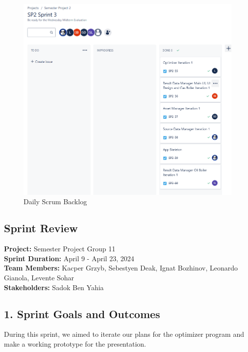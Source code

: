 \documentclass[12pt]{report}
\begin{document}
\begin{figure}[H]
  \centering
  \includegraphics[width=1\textwidth]{Resources/3-Sprint/Daily-Scrum/backlog_sprint3.png}
  \caption{Daily Scrum Backlog}
  \label{fig:S3Scrum1-image}
\end{figure}

\clearpage


\subsection*{Sprint Review}
\textbf{Project:} Semester Project Group 11 \\
\textbf{Sprint Duration:} April 9 - April 23, 2024 \\
\textbf{Team Members:} Kacper Grzyb, Sebestyen Deak, Ignat Bozhinov, Leonardo Gianola, Levente Sohar \\
\textbf{Stakeholders:} Sadok Ben Yahia

\subsection*{1. Sprint Goals and Outcomes}
During this sprint, we aimed to iterate our plans for the optimizer program and make a working prototype for the presentation.
\end{document}
